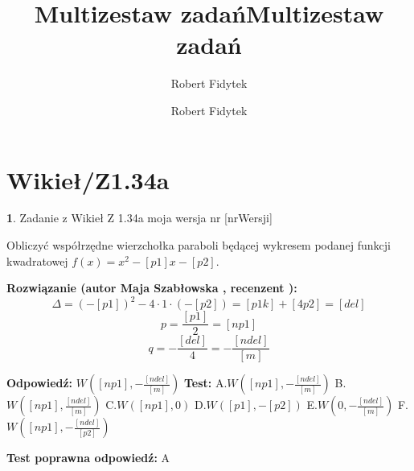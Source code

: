 \documentclass[12pt, a4paper]{article}
\title{Multizestaw zadań}
\author{Robert Fidytek}
\date{}\documentclass[12pt, a4paper]{article}
\title{Multizestaw zadań}
\author{Robert Fidytek}
\date{}
\theoremstyle{definition} %
\newtheorem{zad}{}
\theoremstyle{definition} %
\newtheorem{zad}{}
\newcommand{\kategoria}[1]{\section{#1}} %
\newcommand{\zadStart}[1]{\begin{zad}#1\newline} %
\newcommand{\zadStop}{\end{zad}}   %
\newcommand{\rozwStart}[2]{\noindent \textbf{Rozwiązanie (autor #1 , recenzent #2): }\newline} %
\newcommand{\rozwStop}{\newline}                                            %
\newcommand{\odpStart}{\noindent \textbf{Odpowiedź:}\newline}    %
\newcommand{\odpStop}{\newline}                                             %
\newcommand{\testStart}{\noindent \textbf{Test:}\newline} %
\newcommand{\testStop}{\newline} %
\newcommand{\kluczStart}{\noindent \textbf{Test poprawna odpowiedź:}\newline} %
\newcommand{\kluczStop}{\newline} %
\begin{document}
\maketitle


\kategoria{Wikieł/Z1.34a}
\zadStart{Zadanie z Wikieł Z 1.34a moja wersja nr [nrWersji]}


Obliczyć współrzędne wierzchołka paraboli będącej wykresem podanej funkcji kwadratowej $f(x)=x^{2}-[p1]x-[p2].$
\zadStop

\rozwStart{Maja Szabłowska}{}
$$\Delta=(-[p1])^{2}-4\cdot1\cdot(-[p2])=[p1k]+[4p2]=[del]$$
$$p=\frac{[p1]}{2}=[np1]$$
$$q=-\frac{[del]}{4}=-\frac{[ndel]}{[m]}$$


\rozwStop


\odpStart
$W([np1],-\frac{[ndel]}{[m]})$
\odpStop
\testStart
A.$W([np1],-\frac{[ndel]}{[m]})$
B.$W([np1],\frac{[ndel]}{[m]})$
C.$W([np1],0)$
D.$W([p1],-[p2])$
E.$W(0,-\frac{[ndel]}{[m]})$
F.$W([np1],-\frac{[ndel]}{[p2]})$


\testStop
\kluczStart
A
\kluczStop
\end{document}
